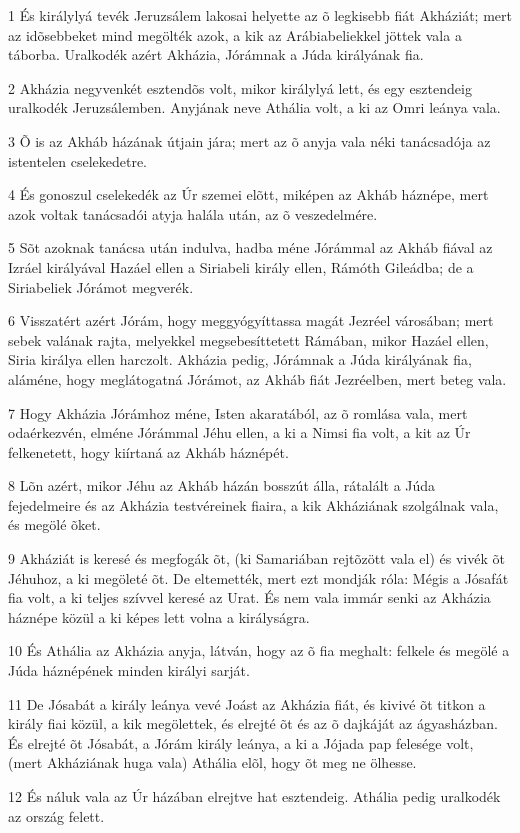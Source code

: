 \par 1 És királylyá tevék Jeruzsálem lakosai helyette az õ legkisebb fiát Akháziát; mert az idõsebbeket mind megölték azok, a kik az Arábiabeliekkel jöttek  vala a táborba. Uralkodék azért Akházia, Jórámnak a Júda királyának fia.
\par 2 Akházia negyvenkét esztendõs volt, mikor királylyá lett, és egy esztendeig uralkodék Jeruzsálemben. Anyjának neve Athália volt, a ki az Omri leánya vala.
\par 3 Õ is az Akháb házának útjain jára; mert az õ anyja vala néki tanácsadója az istentelen cselekedetre.
\par 4 És gonoszul cselekedék az Úr szemei elõtt, miképen az Akháb háznépe, mert azok voltak tanácsadói atyja halála után, az õ veszedelmére.
\par 5 Sõt azoknak tanácsa után indulva, hadba méne Jórámmal az Akháb fiával az Izráel királyával Hazáel ellen a Siriabeli király ellen, Rámóth Gileádba; de a Siriabeliek Jórámot megverék.
\par 6 Visszatért azért Jórám, hogy meggyógyíttassa magát Jezréel városában; mert sebek valának rajta, melyekkel megsebesíttetett Rámában, mikor Hazáel ellen, Siria királya ellen harczolt. Akházia pedig, Jórámnak a Júda királyának fia, aláméne, hogy meglátogatná Jórámot, az Akháb fiát Jezréelben, mert beteg vala.
\par 7 Hogy Akházia Jórámhoz méne, Isten akaratából, az õ romlása vala, mert odaérkezvén, elméne Jórámmal Jéhu ellen, a ki a Nimsi fia volt, a kit az Úr felkenetett, hogy kiírtaná az Akháb háznépét.
\par 8 Lõn azért, mikor Jéhu az Akháb házán bosszút álla, rátalált a Júda fejedelmeire és az Akházia testvéreinek fiaira, a kik Akháziának szolgálnak vala, és megölé õket.
\par 9 Akháziát is keresé és megfogák õt, (ki Samariában rejtõzött vala el) és vivék õt Jéhuhoz, a ki megöleté õt. De eltemették, mert ezt mondják róla: Mégis a Jósafát fia volt, a ki teljes szívvel keresé az Urat. És nem vala immár senki az Akházia háznépe közül a ki képes lett volna a királyságra.
\par 10 És Athália az Akházia anyja, látván, hogy az õ fia meghalt: felkele és megölé a Júda háznépének minden királyi sarját.
\par 11 De Jósabát a király leánya vevé Joást az Akházia fiát, és kivivé õt titkon a király fiai közül, a kik megölettek, és elrejté õt és az õ dajkáját az ágyasházban. És elrejté õt Jósabát, a Jórám király leánya, a ki a Jójada pap felesége volt, (mert Akháziának huga vala) Athália elõl, hogy õt meg ne ölhesse.
\par 12 És náluk vala az Úr házában elrejtve hat esztendeig. Athália pedig uralkodék az ország felett.

